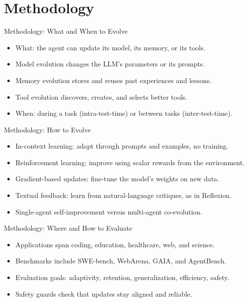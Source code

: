 \documentclass[10pt]{beamer}
\begin{document}
\section{Methodology}
\begin{frame}[allowframebreaks]{Methodology: What and When to Evolve}
\begin{itemize}
  \item What: the agent can update its model, its memory, or its tools.
  \item Model evolution changes the LLM's parameters or its prompts.
  \item Memory evolution stores and reuses past experiences and lessons.
  \item Tool evolution discovers, creates, and selects better tools.
  \item When: during a task (intra-test-time) or between tasks (inter-test-time).
\end{itemize}
\end{frame}
\begin{frame}[allowframebreaks]{Methodology: How to Evolve}
\begin{itemize}
  \item In-context learning: adapt through prompts and examples, no training.
  \item Reinforcement learning: improve using scalar rewards from the environment.
  \item Gradient-based updates: fine-tune the model's weights on new data.
  \item Textual feedback: learn from natural-language critiques, as in Reflexion.
  \item Single-agent self-improvement versus multi-agent co-evolution.
\end{itemize}
\end{frame}
\begin{frame}[allowframebreaks]{Methodology: Where and How to Evaluate}
\begin{itemize}
  \item Applications span coding, education, healthcare, web, and science.
  \item Benchmarks include SWE-bench, WebArena, GAIA, and AgentBench.
  \item Evaluation goals: adaptivity, retention, generalization, efficiency, safety.
  \item Safety guards check that updates stay aligned and reliable.
\end{itemize}
\end{frame}
\end{document}

